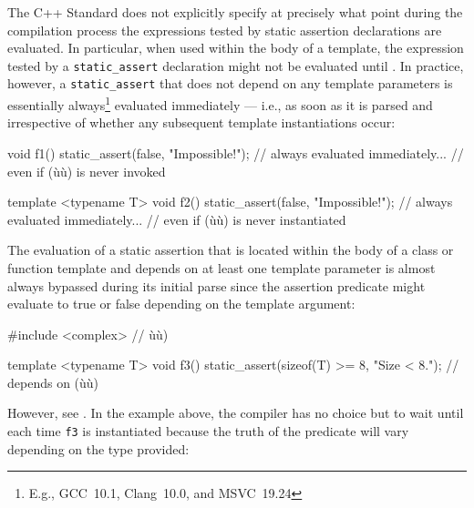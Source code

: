 The C++ Standard does not explicitly specify at precisely what point during
the compilation process the expressions tested by static assertion declarations are
evaluated. In particular, when used within the body of a template, the expression tested by a
\lstinline!static_assert! declaration might not be evaluated until
. In practice, however, a
\lstinline!static_assert! that does not depend on any template parameters
is essentially always{\cprotect\footnote{E.g.,
GCC~10.1, Clang~10.0, and MSVC~19.24}} evaluated immediately --- i.e., as
soon as it is parsed and irrespective of whether any subsequent template
instantiations occur:

\begin{emcppslisting}[emcppserrorlines={3,9}]
void f1()
{
    static_assert(false, "Impossible!");  // always evaluated immediately...
}                                         // even if (ù{}ù) is never invoked

template <typename T>
void f2()
{
    static_assert(false, "Impossible!");  // always evaluated immediately...
}                                         // even if (ù{}ù) is never instantiated
\end{emcppslisting}

\noindent The evaluation of a static assertion that is located within the
body of a class or function template and depends on at least one
template parameter is almost always bypassed during its initial parse since
the assertion predicate might evaluate to true or false depending on the template argument:

\begin{emcppshiddenlisting}[emcppsbatch=e2]
#include <complex>  // ù{}ù)
\end{emcppshiddenlisting}
\begin{emcppslisting}[emcppsbatch=e2]
template <typename T>
void f3()
{
    static_assert(sizeof(T) >= 8, "Size < 8.");  // depends on (ù{}ù)
}
\end{emcppslisting}

\noindent However, see
.
In the example above, the compiler has no choice but to wait until each
time \lstinline!f3! is instantiated because the truth of the predicate will
vary depending on the type provided:

